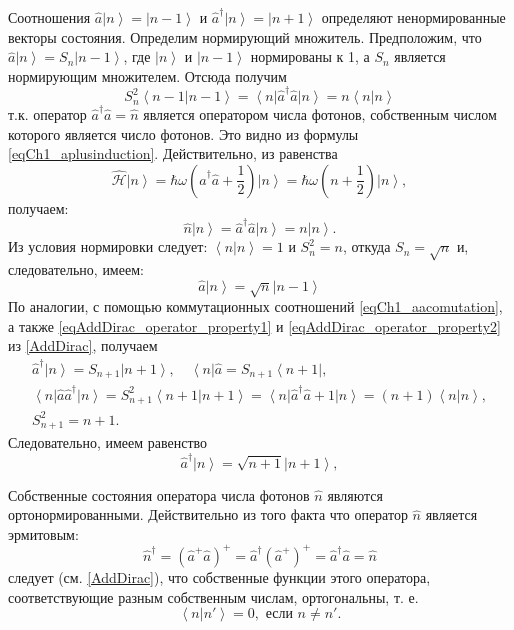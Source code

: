 Соотношения 
$\hat{a} \left|n\right> = \left|n - 1\right>$
и
$\hat{a}^{\dag} \left|n\right> = \left|n + 1\right>$
определяют ненормированные векторы состояния. Определим нормирующий
множитель. Предположим, что  
$\hat{a} \left|n\right> = S_n \left|n - 1\right>$,  где 
$\left|n\right>$ и $\left|n - 1\right>$ нормированы к  1,  а $S_n$
является нормирующим множителем. Отсюда получим 
\[
S_n^2\left<n - 1\right.\left|n - 1\right> =
\left<n\right|\hat{a}^{\dag}\hat{a}\left|n\right> = 
n  \left<n\right.\left|n\right>
\]
т.к. оператор    
$\hat{a}^{\dag}\hat{a} = \hat{n}$
является оператором числа фотонов, собственным числом
которого является число фотонов. Это видно из формулы
\eqref{eqCh1_aplusinduction}. Действительно, из равенства
\[
\hat{\mathcal{H}} \left|n\right> =
\hbar \omega \left(
\hat{a}^{\dag}\hat{a} + \frac{1}{2}
\right)
\left|n\right> = 
\hbar \omega \left(n + \frac{1}{2}\right)
\left|n\right>,
\]
получаем:
\[
\hat{n}\left|n\right> = \hat{a}^{\dag}\hat{a} \left|n\right> = n
\left|n\right>. 
\]
Из условия нормировки следует: $\left<n\right.\left|n\right> = 1$   и
$S_n^2 = n$,  откуда $S_n = \sqrt{n}$ и, следовательно, имеем: 
\begin{equation}
\hat{a}\left|n\right> = \sqrt{n}\left|n - 1\right>
\end{equation}
По аналогии, с помощью коммутационных соотношений
\eqref{eqCh1_aacomutation}, а также \ref{eqAddDirac_operator_property1} и
  \ref{eqAddDirac_operator_property2} из \autoref{AddDirac},
  получаем 
\begin{eqnarray}
\hat{a}^{\dag}\left|n\right> = S_{n+1}\left|n + 1\right>,
\quad 
\left<n\right|\hat{a} = S_{n + 1}\left<n + 1\right|,
\nonumber \\
\left<n\right|\hat{a}\hat{a}^{\dag}\left|n\right> = S_{n+1}^2
\left<n + 1\right|\left.n + 1\right> = 
\left<n\right|\hat{a}^{\dag}\hat{a} + 1\left|n\right> = 
\left(n + 1\right)\left<n\right.\left|n\right>,
\nonumber \\
S_{n+1}^2 = n + 1.
\end{eqnarray}
Следовательно, имеем равенство
\begin{equation}
\hat{a}^{\dag}\left|n\right> = \sqrt{n + 1}\left|n + 1\right>,
\end{equation}

Собственные состояния оператора числа фотонов $\hat{n}$ являются ортонормированными. 
Действительно из того факта что оператор $\hat{n}$ является эрмитовым:
\[
\hat{n}^{\dag} = \left(\hat{a}^{+}\hat{a}\right)^{+} = 
\hat{a}^{\dag} \left(\hat{a}^{+}\right)^{+} = 
\hat{a}^{\dag}\hat{a} = \hat{n}
\]
следует (см. \autoref{AddDirac}), что собственные функции этого оператора,
соответствующие разным собственным числам, ортогональны, т. е.
\begin{equation}
\left<n\right|\left.n'\right> = 0, \mbox{ если } n \ne n'.
\label{eqOrtoN}
\end{equation}

